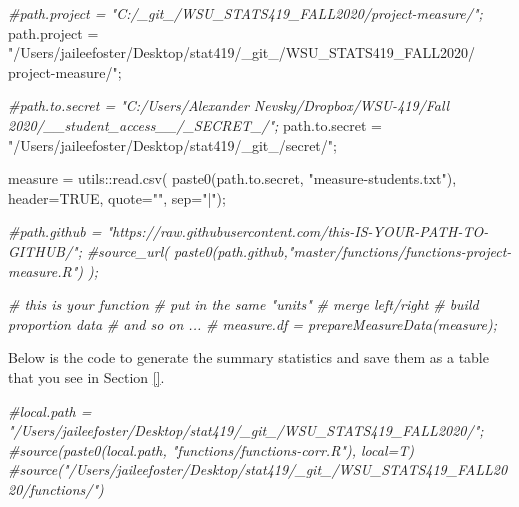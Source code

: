 \documentclass[]{article}
\newenvironment{Shaded}{\begin{snugshade}}{\end{snugshade}}
\newcommand{\AttributeTok}[1]{\textcolor[rgb]{0.77,0.63,0.00}{#1}}
\newcommand{\CommentTok}[1]{\textcolor[rgb]{0.56,0.35,0.01}{\textit{#1}}}
\newcommand{\ConstantTok}[1]{\textcolor[rgb]{0.00,0.00,0.00}{#1}}
\newcommand{\FunctionTok}[1]{\textcolor[rgb]{0.00,0.00,0.00}{#1}}
\newcommand{\NormalTok}[1]{#1}
\newcommand{\OtherTok}[1]{\textcolor[rgb]{0.56,0.35,0.01}{#1}}
\newcommand{\SpecialCharTok}[1]{\textcolor[rgb]{0.00,0.00,0.00}{#1}}
\newcommand{\StringTok}[1]{\textcolor[rgb]{0.31,0.60,0.02}{#1}}
\begin{document}
\begin{Shaded}
\begin{Highlighting}[]
\CommentTok{\#path.project = "C:/\_git\_/WSU\_STATS419\_FALL2020/project{-}measure/";}
\NormalTok{path.project }\OtherTok{=} \StringTok{"/Users/jaileefoster/Desktop/stat419/\_git\_/WSU\_STATS419\_FALL2020/}
\StringTok{                project{-}measure/"}\NormalTok{;}

\CommentTok{\#path.to.secret = "C:/Users/Alexander Nevsky/Dropbox/WSU{-}419/Fall 2020/\_\_student\_access\_\_/\_SECRET\_/";}
\NormalTok{path.to.secret }\OtherTok{=} \StringTok{"/Users/jaileefoster/Desktop/stat419/\_git\_/secret/"}\NormalTok{;}

\NormalTok{measure }\OtherTok{=}\NormalTok{ utils}\SpecialCharTok{::}\FunctionTok{read.csv}\NormalTok{( }\FunctionTok{paste0}\NormalTok{(path.to.secret, }\StringTok{"measure{-}students.txt"}\NormalTok{), }\AttributeTok{header=}\ConstantTok{TRUE}\NormalTok{, }
                           \AttributeTok{quote=}\StringTok{""}\NormalTok{, }\AttributeTok{sep=}\StringTok{"|"}\NormalTok{);}

\CommentTok{\#path.github = "https://raw.githubusercontent.com/this{-}IS{-}YOUR{-}PATH{-}TO{-}GITHUB/";}
\CommentTok{\#source\_url( paste0(path.github,"master/functions/functions{-}project{-}measure.R") );}

\CommentTok{\# this is your function}
\CommentTok{\# put in the same "units"}
\CommentTok{\# merge left/right}
\CommentTok{\# build proportion data}
\CommentTok{\# and so on ... }
\CommentTok{\# measure.df = prepareMeasureData(measure);}
\end{Highlighting}
\end{Shaded}

Below is the code to generate the summary statistics and save them as a
table that you see in Section \ref{}.

\begin{Shaded}
\begin{Highlighting}[]
\CommentTok{\#local.path = "/Users/jaileefoster/Desktop/stat419/\_git\_/WSU\_STATS419\_FALL2020/";}
\CommentTok{\#source(paste0(local.path, "functions/functions{-}corr.R"), local=T)}
\CommentTok{\#source("/Users/jaileefoster/Desktop/stat419/\_git\_/WSU\_STATS419\_FALL2020/functions/")}
\end{Highlighting}
\end{Shaded}







\newpage
\theendnotes

\newpage
\begin{auxmulticols}{1}
\singlespacing 


\end{auxmulticols}

\newpage
{
\hypersetup{linkcolor=black}
\setcounter{tocdepth}{3}
\tableofcontents
}
\end{document}

